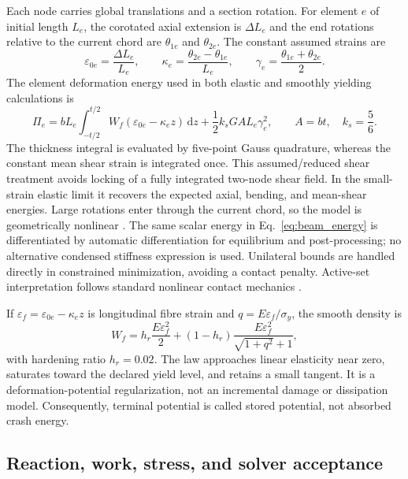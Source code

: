 \documentclass[11pt]{article}
\begin{document}
Each node carries global translations and a section rotation. For element $e$ of initial length $L_e$, the corotated axial extension is $\Delta L_e$ and the end rotations relative to the current chord are $\theta_{1e}$ and $\theta_{2e}$. The constant assumed strains are
\begin{equation}
\varepsilon_{0e}=\frac{\Delta L_e}{L_e},\qquad
\kappa_e=\frac{\theta_{2e}-\theta_{1e}}{L_e},\qquad
\gamma_e=\frac{\theta_{1e}+\theta_{2e}}{2}.
\label{eq:assumed_strains}
\end{equation}
The element deformation energy used in both elastic and smoothly yielding calculations is
\begin{equation}
\Pi_e=bL_e\int_{-t/2}^{t/2}
W_f(\varepsilon_{0e}-\kappa_e z)\,\mathrm dz
+\frac{1}{2}k_sGA L_e\gamma_e^2,
\qquad A=bt,\quad k_s=\frac{5}{6}.
\label{eq:beam_energy}
\end{equation}
The thickness integral is evaluated by five-point Gauss quadrature, whereas the constant mean shear strain is integrated once. This assumed/reduced shear treatment avoids locking of a fully integrated two-node shear field. In the small-strain elastic limit it recovers the expected axial, bending, and mean-shear energies. Large rotations enter through the current chord, so the model is geometrically nonlinear \citep{Crisfield1991}. The same scalar energy in Eq.~\eqref{eq:beam_energy} is differentiated by automatic differentiation for equilibrium and post-processing; no alternative condensed stiffness expression is used. Unilateral bounds are handled directly in constrained minimization, avoiding a contact penalty. Active-set interpretation follows standard nonlinear contact mechanics \citep{Wriggers2006}.

If $\varepsilon_f=\varepsilon_{0e}-\kappa_ez$ is longitudinal fibre strain and $q=E\varepsilon_f/\sigma_y$, the smooth density is
\begin{equation}
W_f=h_r\frac{E\varepsilon_f^2}{2}
+(1-h_r)\frac{E\varepsilon_f^2}{\sqrt{1+q^2}+1},
\label{eq:smooth_yield}
\end{equation}
with hardening ratio $h_r=0.02$. The law approaches linear elasticity near zero, saturates toward the declared yield level, and retains a small tangent. It is a deformation-potential regularization, not an incremental damage or dissipation model. Consequently, terminal potential is called stored potential, not absorbed crash energy.

\subsection{Reaction, work, stress, and solver acceptance}
\end{document}
